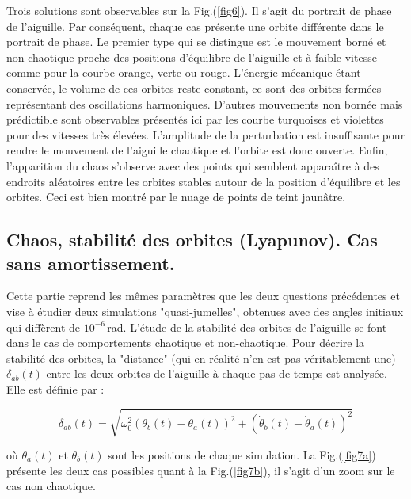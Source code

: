 \documentclass[a4paper,12pt,twoside]{article}
\begin{document}
\vspace{-0.4cm}

Trois solutions sont observables sur la Fig.(\ref{fig6}). Il s'agit du portrait de phase de l'aiguille. Par conséquent, chaque cas présente une orbite différente dans le portrait de phase. Le premier type qui se distingue est le mouvement borné et non chaotique proche des positions d'équilibre de l'aiguille et à faible vitesse comme pour la courbe orange, verte ou rouge. L'énergie mécanique étant conservée, le volume de ces orbites reste constant, ce sont des orbites fermées représentant des oscillations harmoniques. D'autres mouvements non bornée mais prédictible sont observables présentés ici par les courbe turquoises et violettes pour des vitesses très élevées. L'amplitude de la perturbation est insuffisante pour rendre le mouvement de l'aiguille chaotique et l'orbite est donc ouverte. Enfin, l'apparition du chaos s'observe avec des points qui semblent apparaître à des endroits aléatoires entre les orbites stables autour de la position d'équilibre et les orbites. Ceci est bien montré par le nuage de points de teint jaunâtre.

\vspace{-0.4cm}

\subsection{Chaos, stabilité des orbites (Lyapunov). Cas sans amortissement.}

\vspace{-0.2cm}

Cette partie reprend les mêmes paramètres que les deux questions précédentes et vise à étudier deux simulations "quasi-jumelles", obtenues avec des angles initiaux qui diffèrent de $10^{-6}$\,rad. L'étude de la stabilité des orbites de l'aiguille se font dans le cas de comportements chaotique et non-chaotique. Pour décrire la stabilité des orbites, la "distance" (qui en réalité n'en est pas véritablement une) $\delta_{ab}(t)$ entre les deux orbites de l'aiguille à chaque pas de temps est analysée. Elle est définie par :



\[
\delta_{ab}(t) = \sqrt{\omega^2_0 (\theta_b(t) - \theta_a(t))^2 + (\dot{\theta}_b(t) - \dot{\theta}_a(t))^2}
\]



\noindent où $\theta_a(t)$ et $\theta_b(t)$ sont les positions de chaque simulation. La Fig.(\ref{fig7a}) présente les deux cas possibles quant à la Fig.(\ref{fig7b}), il s'agit d'un zoom sur le cas non chaotique. 
\end{document}
